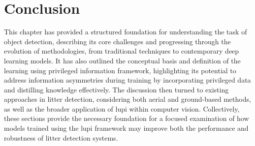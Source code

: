 \section{Conclusion}
\label{sec:2_conclusion}

This chapter has provided a structured foundation for understanding the task of object detection, describing its core challenges and progressing through the evolution of methodologies, from traditional techniques to contemporary deep learning models. It has also outlined the conceptual basis and definition of the learning using privileged information framework, highlighting its potential to address information asymmetries during training by incorporating privileged data and distilling knowledge effectively. The discussion then turned to existing approaches in litter detection, considering both aerial and ground-based methods, as well as the broader application of \gls{lupi} within computer vision. Collectively, these sections provide the necessary foundation for a focused examination of how models trained using the \gls{lupi} framework may improve both the performance and robustness of litter detection systems.





